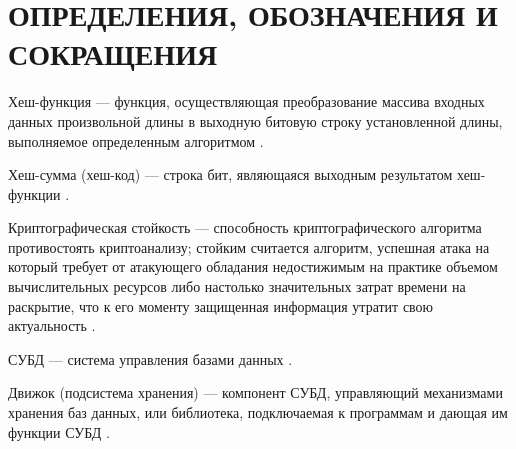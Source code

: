 \section*{ОПРЕДЕЛЕНИЯ, ОБОЗНАЧЕНИЯ И СОКРАЩЕНИЯ}

Хеш-функция --- функция, осуществляющая преобразование массива входных данных произвольной длины в выходную битовую строку установленной длины, выполняемое определенным алгоритмом \cite{hash}.

Хеш-сумма (хеш-код) --- строка бит, являющаяся выходным результатом хеш-функции \cite{hashsum}.

Криптографическая стойкость --- способность криптографического алгоритма противостоять криптоанализу; стойким считается алгоритм, успешная атака на который требует от атакующего обладания недостижимым на практике объемом вычислительных ресурсов либо настолько значительных затрат времени на раскрытие, что к его моменту защищенная информация утратит свою актуальность \cite{crypto}.

СУБД --- система управления базами данных \cite{dbms}.

Движок (подсистема хранения) ---  компонент СУБД, управляющий механизмами хранения баз данных, или библиотека, подключаемая к программам и дающая им функции СУБД \cite{dbengine}\cite{mysqlengines}.

\pagebreak